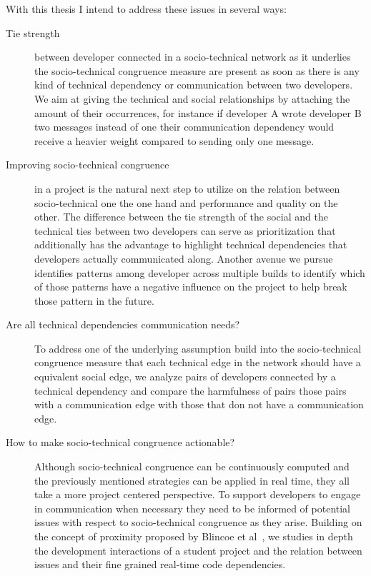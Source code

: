 With this thesis I intend to address these issues in several ways:
\begin{description}
\item[Tie strength] between developer connected in a socio-technical network as it underlies the socio-technical congruence measure are present as soon as there is any kind of technical dependency or communication between two developers.
We aim at giving the technical and social relationships by attaching the amount of their occurrences, for instance if developer A wrote developer B two messages instead of one their communication dependency would receive a heavier weight compared to sending only one message. 

\item[Improving socio-technical congruence] in a project is the natural next step to utilize on the  relation between socio-technical one the one hand and performance and quality on the other.
The difference between the tie strength of the social and the technical ties between two developers can serve as prioritization that additionally has the advantage to highlight technical dependencies that developers actually communicated along.
Another avenue we pursue identifies patterns among developer across multiple builds to identify which of those patterns have a negative influence on the project to help break those pattern in the future.

\item[Are all technical dependencies communication needs?] To address one of the underlying assumption build into the socio-technical congruence measure that each technical edge in the network should have a equivalent social edge, we analyze pairs of developers connected by a technical dependency and compare the harmfulness of pairs those pairs with a communication edge with those that don not have a communication edge.

\item[How to make socio-technical congruence actionable?] Although socio-technical congruence can be continuously computed and the previously mentioned strategies can be applied in real time, they all take a more project centered perspective.
To support developers to engage in communication when necessary they need to be informed of potential issues with respect to socio-technical congruence as they arise.
Building on the concept of proximity proposed by Blincoe et al~\cite{blincoe:cscw:2012}, we studies in depth the development interactions of a student project and the relation between issues and their fine grained real-time code dependencies.

\end{description}

